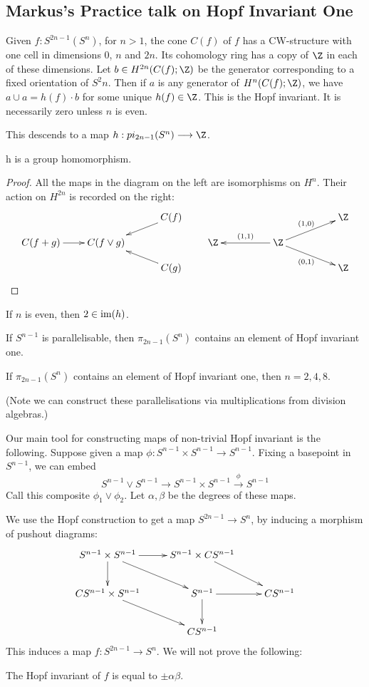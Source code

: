 \documentclass[11pt]{article}
\newcommand{\KanSemResponse}[1]
{
\thispagestyle{fancy}
\section{#1}
}
\begin{document}
\begin{MarkusHopfInvOnePractice}
\KanSemResponse
{Markus's Practice talk on Hopf Invariant One}
Given $f:S^{2n-1}(S^n)$, for $n>1$, the cone $C(f)$ of $f$ has a CW-structure with one cell in dimensions 0, $n$ and $2n$. Its cohomology ring has a copy of $\Z$ in each of these dimensions. Let $b\in H^{2n}(C(f);\Z)$ be the generator corresponding to a fixed orientation of $S^2n$. Then if $a$ is any generator of $H^{n}(C(f);\Z)$, we have $a\cup a=h(f)\cdot b$ for some unique $h(f)\in\Z$. This is the Hopf invariant. It is necessarily zero unless $n$ is even.

This descends to a map $h:pi_{2n-1}(S^n)\to\Z$.
\begin{lem*}
h is a group homomorphism.
\end{lem*}
\begin{proof} All the maps in the diagram on the left are isomorphisms on $H^n$. Their action on $H^{2n}$ is recorded on the right:
\[\xymatrix@!0@R=.9cm@C=2.3cm{
&&C(f)\ar[ld]\\
C(f+g)\ar[r]&C(f\vee g)\\
&&C(g)\ar[lu]
}\qquad\xymatrix@!0@R=.9cm@C=2.3cm{
&&\Z\ar[ld];[]^{(1,0)}\\
\Z\ar[r];[]_{(1,1)}&\Z\\
&&\Z\ar[lu];[]_{(0,1)}
}\]
\end{proof}
\begin{prop*}
If $n$ is even, then $2\in\operatorname{im}(h)$.
\end{prop*}
\begin{prop*}
If $S^{n-1}$ is parallelisable, then $\pi_{2n-1}(S^n)$ contains an element of Hopf invariant one.
\end{prop*}
\begin{thm*}
If $\pi_{2n-1}(S^n)$ contains an element of Hopf invariant one, then $n=2,4,8$.
\end{thm*}
\noindent (Note we can construct these parallelisations via multiplications from division algebras.)

Our main tool for constructing maps of non-trivial Hopf invariant is the following. Suppose given a map $\phi:S^{n-1}\times S^{n-1}\to S^{n-1}$. Fixing a basepoint in $S^{n-1}$, we can embed
\[S^{n-1}\vee S^{n-1}\to S^{n-1}\times S^{n-1}\overset{\phi}{\to} S^{n-1}\]
Call this composite $\phi_1\vee\phi_2$. Let $\alpha,\beta$ be the degrees of these maps.

We use the Hopf construction to get a map $S^{2n-1}\to S^n$, by inducing a morphism of pushout diagrams:
\[\xymatrix{%
S^{n-1}\times S^{n-1}\ar[r]\ar[d]\ar[rd]&S^{n-1}\times CS^{n-1}\ar[rd]\\
CS^{n-1}\times S^{n-1}\ar[rd]&S^{n-1}\ar[r] \ar[d]&CS^{n-1}\\
&CS^{n-1}
}\]
This induces a map $f:S^{2n-1}\to S^n$. We will not prove the following:
\begin{prop*}
The Hopf invariant of $f$ is equal to $\pm\alpha\beta$.
\end{prop*}


\end{MarkusHopfInvOnePractice}
\end{document}

